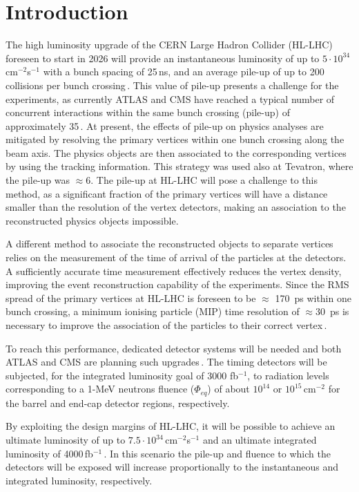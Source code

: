 \documentclass[review,number,sort&compress]{elsarticle}
\begin{document}
\section{Introduction}

The high luminosity upgrade of the CERN Large Hadron Collider (HL-LHC) foreseen to start in 2026 will provide an instantaneous luminosity of up to $5 \cdot 10^{34}$\,cm$^{-2}$s$^{-1}$ with a bunch spacing of 25\,ns, and an average pile-up of up to 200 collisions per bunch crossing\,\cite{hlLhcTecDesRep}.
This value of pile-up presents a challenge for the experiments, as currently ATLAS and CMS have reached a typical number of concurrent interactions within the same bunch crossing (pile-up) of approximately 35\,\cite{atlasPileup,cmsPileup}.
At present, the effects of pile-up on physics analyses are mitigated by resolving the primary vertices within one bunch crossing along the beam axis.
The physics objects are then associated to the corresponding vertices by using the tracking information.
This strategy was used also at Tevatron, where the pile-up was $\approx 6$.
The pile-up at HL-LHC will pose a challenge to this method, as a significant fraction of the primary vertices will have a distance smaller than the resolution of the vertex detectors, making an association to the reconstructed physics objects impossible.

A different method to associate the reconstructed objects to separate vertices relies on the measurement of the time of arrival of the particles at the detectors.
A sufficiently accurate time measurement effectively reduces the vertex density, improving the event reconstruction capability of the experiments.
Since the RMS spread of the primary vertices at HL-LHC is foreseen to be $\approx$ 170~ps within one bunch crossing, a minimum ionising particle (MIP) time resolution of $\approx 30$~ps is necessary to improve the association of the particles to their correct vertex\,\cite{cmsMIPtiming,atlasMIPtiming}.

To reach this performance, dedicated detector systems will be needed and both ATLAS and CMS are planning such upgrades\,\cite{cmsMIPtiming,atlasMIPtiming}.
The timing detectors will be subjected, for the integrated luminosity goal of 3000 fb$^{-1}$, to radiation levels corresponding to a 1-MeV neutrons fluence ($\Phi_{eq}$) of about $10^{14}$ or $10^{15}$\,cm$^{-2}$ for the barrel and end-cap detector regions, respectively.

By exploiting the design margins of HL-LHC, it will be possible to achieve an ultimate luminosity of up to $7.5 \cdot 10^{34}$\,cm$^{-2}$s$^{-1}$ and an ultimate integrated luminosity of 4000\,fb$^{-1}$\,\cite{hlLhcTecDesRep}.
In this scenario the pile-up and fluence to which the detectors will be exposed will increase proportionally to the instantaneous and integrated luminosity, respectively.
\end{document}
